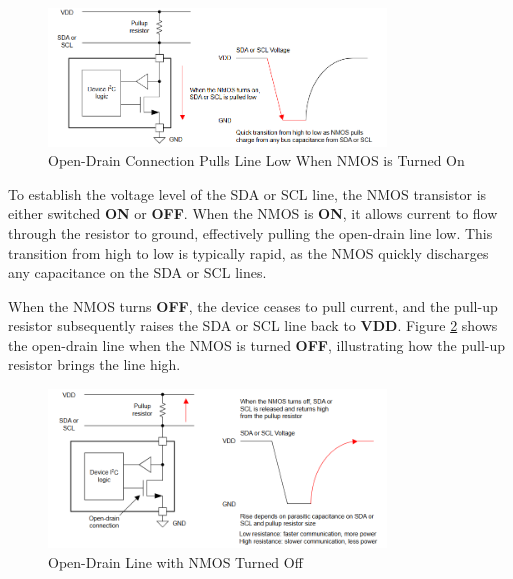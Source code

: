 \documentclass[a4paper,12pt]{report}
\begin{document}
\begin{figure}[htbp]
    \centering
    \includegraphics[width=0.8\textwidth]{open_drain_connection.png} %
    \caption{Open-Drain Connection Pulls Line Low When NMOS is Turned On}
    \label{fig:open_drain_connection}
\end{figure}


To establish the voltage level of the SDA or SCL line, the NMOS transistor is either switched \textbf{ON} or \textbf{OFF}. When the NMOS is \textbf{ON}, it allows current to flow through the resistor to ground, effectively pulling the open-drain line low. This transition from high to low is typically rapid, as the NMOS quickly discharges any capacitance on the SDA or SCL lines.

\vspace{0.25in}

When the NMOS turns \textbf{OFF}, the device ceases to pull current, and the pull-up resistor subsequently raises the SDA or SCL line back to \textbf{VDD}. Figure \ref{fig:open_drain_off} shows the open-drain line when the NMOS is turned \textbf{OFF}, illustrating how the pull-up resistor brings the line high.

\begin{figure}[htbp]
    \centering
    \includegraphics[width=0.8\textwidth]{open_drain_off.png} %
    \caption{Open-Drain Line with NMOS Turned Off}
    \label{fig:open_drain_off}
\end{figure}
\end{document}
